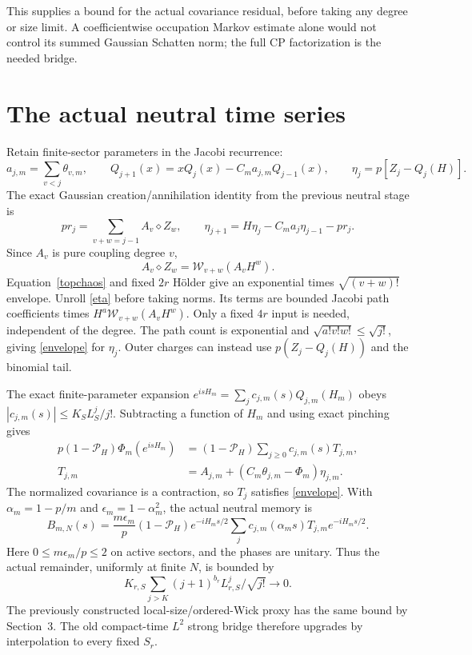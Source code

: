 \documentclass[11pt]{article}
\newcommand{\WW}{\mathcal W}
\newcommand{\PP}{\mathcal P_H}
\begin{document}
This supplies a bound for the actual covariance residual, before
taking any degree or size limit. A coefficientwise occupation
Markov estimate alone would not control its summed Gaussian
Schatten norm; the full CP factorization is the needed bridge.

\newpage
\section{The actual neutral time series}
Retain finite-sector parameters in the Jacobi recurrence:
\begin{equation}
 a_{j,m}=\sum_{v<j}\theta_{v,m},\qquad
 Q_{j+1}(x)=xQ_j(x)-C_ma_{j,m}Q_{j-1}(x),
 \qquad \eta_j=p[Z_j-Q_j(H)].
\end{equation}
The exact Gaussian creation/annihilation identity from the previous
neutral stage \cite{Neutral} is
\begin{equation}\label{eta}
 pr_j=\sum_{v+w=j-1}A_v\diamond Z_w,
 \qquad \eta_{j+1}=H\eta_j-C_ma_j\eta_{j-1}-pr_j.
\end{equation}
Since $A_v$ is pure coupling degree $v$,
\begin{equation}
 A_v\diamond Z_w=\WW_{v+w}(A_vH^w).
\end{equation}
Equation~\eqref{topchaos} and fixed $2r$ H\"older give an exponential
times $\sqrt{(v+w)!}$ envelope. Unroll \eqref{eta} before taking
norms. Its terms are bounded Jacobi path coefficients times
$H^a\WW_{v+w}(A_vH^w)$. Only a fixed $4r$ input is needed,
independent of the degree. The path count is exponential and
$\sqrt{a!v!w!}\le\sqrt{j!}$, giving \eqref{envelope} for $\eta_j$.
Outer charges can instead use $p(Z_j-Q_j(H))$ and the binomial tail.

The exact finite-parameter expansion
$e^{isH_m}=\sum_jc_{j,m}(s)Q_{j,m}(H_m)$ obeys
$|c_{j,m}(s)|\le K_S L_S^j/j!$. Subtracting a function of $H_m$
and using exact pinching gives
\begin{align}\label{neutral}
 p(1-\PP)\Phi_m(e^{isH_m})
 &=(1-\PP)\sum_{j\ge0}c_{j,m}(s)T_{j,m},\\
 T_{j,m}&=A_{j,m}+(C_m\theta_{j,m}-\Phi_m)\eta_{j,m}.
\end{align}
The normalized covariance is a contraction, so $T_j$ satisfies
\eqref{envelope}. With $\alpha_m=1-p/m$ and
$\epsilon_m=1-\alpha_m^2$, the actual neutral memory is
\begin{equation}
 B_{m,N}(s)=\frac{m\epsilon_m}{p}(1-\PP)e^{-iH_ms/2}
 \sum_jc_{j,m}(\alpha_ms)T_{j,m}e^{-iH_ms/2}.
\end{equation}
Here $0\le m\epsilon_m/p\le2$ on active sectors, and the phases
are unitary. Thus the actual remainder, uniformly at finite $N$, is
bounded by
\begin{equation}\label{tail}
 K_{r,S}\sum_{j>K}(j+1)^{b_r}L_{r,S}^j/\sqrt{j!}
 \longrightarrow0.
\end{equation}
The previously constructed local-size/ordered-Wick proxy has the
same bound by Section~3. The old compact-time $L^2$ strong bridge
therefore upgrades by interpolation to every fixed $S_r$.
\end{document}
